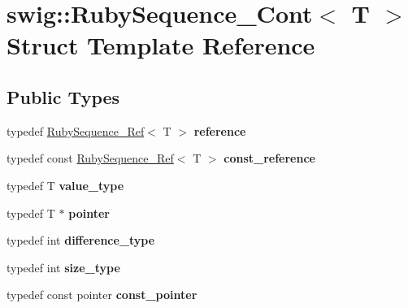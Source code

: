 \hypertarget{structswig_1_1RubySequence__Cont}{}\section{swig\+:\+:Ruby\+Sequence\+\_\+\+Cont$<$ T $>$ Struct Template Reference}
\label{structswig_1_1RubySequence__Cont}
\subsection*{Public Types}
\begin{DoxyCompactItemize}
\item 
typedef \hyperlink{structswig_1_1RubySequence__Ref}{Ruby\+Sequence\+\_\+\+Ref}$<$ T $>$ {\bfseries reference}\hypertarget{structswig_1_1RubySequence__Cont_ac2ac6a69de467a5cc38b968e6a6c1968}{}\label{structswig_1_1RubySequence__Cont_ac2ac6a69de467a5cc38b968e6a6c1968}

\item 
typedef const \hyperlink{structswig_1_1RubySequence__Ref}{Ruby\+Sequence\+\_\+\+Ref}$<$ T $>$ {\bfseries const\+\_\+reference}\hypertarget{structswig_1_1RubySequence__Cont_a92ed083d0eb03c824316e5ca1ee082f4}{}\label{structswig_1_1RubySequence__Cont_a92ed083d0eb03c824316e5ca1ee082f4}

\item 
typedef T {\bfseries value\+\_\+type}\hypertarget{structswig_1_1RubySequence__Cont_a2ee5a8d27e200613084c5bea6534cab6}{}\label{structswig_1_1RubySequence__Cont_a2ee5a8d27e200613084c5bea6534cab6}

\item 
typedef T $\ast$ {\bfseries pointer}\hypertarget{structswig_1_1RubySequence__Cont_a17fb4ed7b455ffadb930b9808b86a195}{}\label{structswig_1_1RubySequence__Cont_a17fb4ed7b455ffadb930b9808b86a195}

\item 
typedef int {\bfseries difference\+\_\+type}\hypertarget{structswig_1_1RubySequence__Cont_a2d06fb1c46155af597fc4186e64e0c09}{}\label{structswig_1_1RubySequence__Cont_a2d06fb1c46155af597fc4186e64e0c09}

\item 
typedef int {\bfseries size\+\_\+type}\hypertarget{structswig_1_1RubySequence__Cont_a0b04f261bdea88e114e9f009d0619063}{}\label{structswig_1_1RubySequence__Cont_a0b04f261bdea88e114e9f009d0619063}

\item 
typedef const pointer {\bfseries const\+\_\+pointer}\hypertarget{structswig_1_1RubySequence__Cont_a67b832a8159378237be6990decdf9477}{}\label{structswig_1_1RubySequence__Cont_a67b832a8159378237be6990decdf9477}


\end{DoxyCompactItemize}
